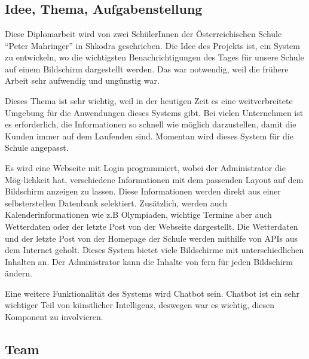 \chapter{\docname}
\label{\docname}

\section{Idee, Thema, Aufgabenstellung}
Diese Diplomarbeit wird von zwei Sch\"{u}lerInnen der \"{O}sterreichischen Schule \textquotedblleft{}Peter Mahringer\textquotedblright{} in Shkodra geschrieben. Die Idee des Projekts ist, ein System zu entwickeln, wo die wichtigsten Benachrichtigungen des Tages f\"{u}r unsere Schule auf einem Bildschirm dargestellt werden. Das war notwendig, weil die fr\"{u}here Arbeit sehr aufwendig und ung\"{u}nstig war.  

Dieses Thema ist sehr wichtig, weil in der heutigen Zeit es eine weitverbreitete Umgebung f\"{u}r die Anwendungen dieses Systems gibt. Bei vielen Unternehmen ist es erforderlich, die Informationen so schnell wie m\"{o}glich darzustellen, damit die Kunden immer auf dem Laufenden sind. Momentan wird dieses System f\"{u}r die Schule angepasst.  

Es wird eine Webseite mit Login programmiert, wobei der Administrator die M\"og-lichkeit hat, verschiedene Informationen mit dem passenden Layout auf dem Bildschirm anzeigen zu lassen. Diese Informationen werden direkt aus einer selbsterstellen Datenbank selektiert. Zus\"{a}tzlich, werden auch Kalenderinformationen wie z.B Olympiaden, wichtige Termine aber auch Wetterdaten oder der letzte Post von der Webseite dargestellt. Die Wetterdaten und der letzte Post von der Homepage der Schule werden mithilfe von APIs aus dem Internet geholt.  
Dieses System bietet viele Bildschirme mit unterschiedlichen Inhalten an. Der Administrator kann die Inhalte von fern f\"{u}r jeden Bildschirm \"{a}ndern. 

Eine weitere Funktionalit\"{a}t des Systems wird Chatbot sein. Chatbot ist ein sehr wichtiger Teil von k\"{u}nstlicher Intelligenz, deswegen war es wichtig, diesen Komponent zu involvieren. 


\section{Team}

